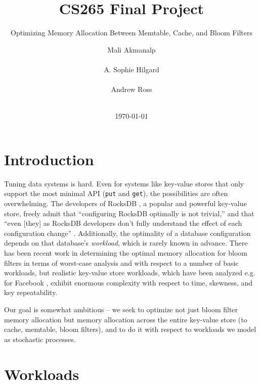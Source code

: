 \documentclass{sig-alternate-05-2015}
\begin{document}
\title{CS265 Final Project}
\subtitle{Optimizing Memory Allocation Between Memtable, Cache, and Bloom Filters}
\author{
\alignauthor
Mali Akmanalp\\
       \\
\alignauthor
A. Sophie Hilgard\\
       \\
\alignauthor Andrew Ross\\
       \\
       }

\date{\today}

\maketitle

\section{Introduction}
Tuning data systems is hard. Even for systems like key-value stores that only
support the most minimal API (\texttt{put} and \texttt{get}), the possibilities
are often overwhelming. The developers of RocksDB \cite{facebook:rocksdb}, a
popular and powerful key-value store, freely admit that ``configuring RocksDB
optimally is not trivial,'' and that ``even [they] as RocksDB developers don't
fully understand the effect of each configuration change''
\cite{rocksdb-tuning-guide}. Additionally, the optimality of a database configuration
depends on that database's \textit{workload}, which is rarely known in advance.
There has been recent work \cite{monkey} in
determining the optimal memory allocation for bloom filters in terms of
worst-case analysis and with respect to a number of basic workloads, but
realistic key-value store workloads, which have been analyzed e.g. for Facebook
\cite{characterizing-memcached}, exhibit enormous complexity with respect to
time, skewness, and key repeatability.

Our goal is somewhat ambitious -- we seek to optimize not just bloom filter
memory allocation but memory allocation across the entire key-value store (to
cache, memtable, bloom filters), and to do it
with respect to workloads we model as stochastic processes.

\section{Workloads}
\end{document}
